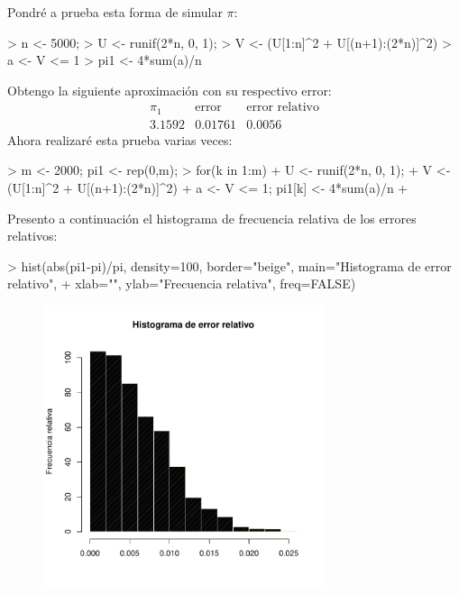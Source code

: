 \documentclass[11pt]{article}
\begin{document}
Pondré a prueba esta forma de simular \(\pi\):
\begin{Schunk}
\begin{Sinput}
> n <- 5000; 
> U <- runif(2*n, 0, 1);
> V <- (U[1:n]^2 + U[(n+1):(2*n)]^2)
> a <- V <= 1
> pi1 <- 4*sum(a)/n
\end{Sinput}
\end{Schunk}
Obtengo la siguiente aproximación con su respectivo error:
\[
    \begin{array}{c|c|c}
        \pi_1 & \text{error} & \text{error relativo}
        \\ \hline
        3.1592 & 0.01761 & 0.0056
    \end{array}
\]
Ahora realizaré esta prueba varias veces:
\begin{Schunk}
\begin{Sinput}
> m <- 2000;      pi1 <- rep(0,m);
> for(k in 1:m){
+     U <- runif(2*n, 0, 1);
+     V <- (U[1:n]^2 + U[(n+1):(2*n)]^2)
+     a <- V <= 1;    pi1[k] <- 4*sum(a)/n
+ }
\end{Sinput}
\end{Schunk}
Presento a continuación el histograma de frecuencia relativa de los errores relativos:
\begin{Schunk}
\begin{Sinput}
> hist(abs(pi1-pi)/pi, density=100, border="beige", main="Histograma de error relativo", 
+      xlab="", ylab="Frecuencia relativa", freq=FALSE)
\end{Sinput}
\end{Schunk}
\begin{center}
\begin{figure}[!h]
    \centering
    \includegraphics[width=3.25in]{EPFL-histograma}
\end{figure}
\end{center}
\end{document}

